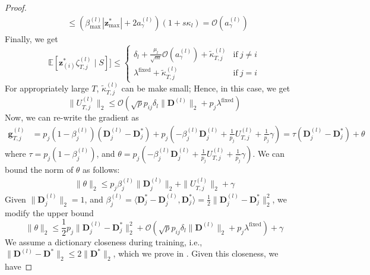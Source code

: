 \documentclass[10pt]{article} %
\newcommand{\E}{\mathbb{E}} %
\newcommand{\D}{{\bm D}}
\newcommand{\z}{{\bm z}}
\newcommand{\g}{{\bm g}}
\begin{document}
\begin{proof}
\begin{equation}
\begin{aligned}
&\leq (\beta_{\text{max}}^{(l)} | \z^{\ast}_{\text{max}} | + 2 a_{\gamma}^{(l)}) (1 + s \kappa_l) = \mathcal{O}(a_{\gamma}^{(l)})
\end{aligned}
\end{equation}
Finally, we get
\begin{equation}
\E[\z_{(i)}^{\ast} \zeta_{T,j}^{(l)} \mid S]] \leq
\begin{cases} 
\delta_l + \frac{\mu_l}{\sqrt{m}} \mathcal{O}(a_{\gamma}^{(l)}) + \tilde \kappa_{T,j}^{(l)} &\text{if}\ j \neq i\\
\lambda^{\text{fixed}} + \tilde \kappa_{T,j}^{(l)} &\text{if}\ j = i
\end{cases}
\end{equation}
For appropriately large $T$, $\tilde \kappa_{T,j}^{(l)}$ can be make small; Hence, in this case, we get
\begin{equation}
\| U_{T,j}^{(l)} \|_2 \leq \mathcal{O}(\sqrt{p} p_{ij} \delta_l \| \D^{(l)}\|_2 + p_j \lambda^{\text{fixed}})
\end{equation}
%
Now, we can re-write the gradient as
\begin{equation}
\begin{aligned}
    \g_{T, j}^{(l)} &= p_j (1 - \beta_j^{(l)}) (\D_j^{(l)}
    - \D_j^{\ast}) + p_j (- \beta_j^{(l)} \D_j^{(l)} + \frac{1}{p_j} U_{T, j}^{(l)} + \frac{1}{p_j}\gamma) = \tau (\D_j^{(l)}
    - \D_j^{\ast}) + \theta
\end{aligned}
\end{equation}
where $\tau = p_j (1 - \beta_j^{(l)})$, and $\theta = p_j (- \beta_j^{(l)} \D_j^{(l)} + \frac{1}{p_j} U_{T, j}^{(l)} + \frac{1}{p_j}\gamma)$. We can bound the norm of $\theta$ as follows:
\begin{equation}
\begin{aligned}
  \| \theta \|_2 \leq p_j \beta_j^{(l)} \| \D_j^{(l)}\|_2  + \| U_{T, j}^{(l)} \|_2 + \gamma
\end{aligned}
\end{equation}
Given $\| \D_j^{(l)} \|_2 = 1$, and $\beta_j^{(l)} =  \langle \D_j^{\ast} - \D_j^{(l)}, \D_j^{\ast} \rangle = \frac{1}{2} \| \D_j^{(l)} - \D_j^{\ast} \|_2^2$, we modify the upper bound
\begin{equation}
  \| \theta \|_2 \leq \frac{1}{2} p_j \| \D_j^{(l)} - \D_j^{\ast} \|_2^2  + \mathcal{O}(\sqrt{p} p_{ij} \delta_l \| \D^{(l)}\|_2 + p_j \lambda^{\text{fixed}}) + \gamma
\end{equation}
We assume a dictionary closeness during training, i.e., $\| \D^{(l)} - \D^{\ast} \|_2 \leq 2 \| \D^{\ast} \|_2$, which we prove in . Given this closeness, we have

\end{proof}
\end{document}

